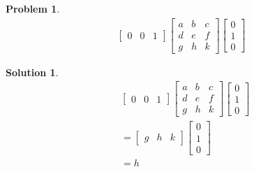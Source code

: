 \documentclass{article}
\newtheorem{problem}{Problem}
\newtheorem*{solution}{Solution}
\begin{document}
\begin{problem}
\begin{align*}
\begin{bmatrix}
0 & 0 & 1 
\end{bmatrix} 
\begin{bmatrix}
a & b & c \\ d & e & f \\ g & h & k
\end{bmatrix}
\begin{bmatrix}
0 \\ 1 \\ 0 
\end{bmatrix} 
\end{align*}
\end{problem}

\begin{solution}
\begin{align*}
& \begin{bmatrix}
0 & 0 & 1 
\end{bmatrix} 
\begin{bmatrix}
a & b & c \\ d & e & f \\ g & h & k
\end{bmatrix}
\begin{bmatrix}
0 \\ 1 \\ 0 
\end{bmatrix} \\
&=\begin{bmatrix}
g & h & k 
\end{bmatrix} 
\begin{bmatrix}
0 \\ 1 \\ 0 
\end{bmatrix} \\
&= h
\end{align*}
\end{solution}
\end{document}
